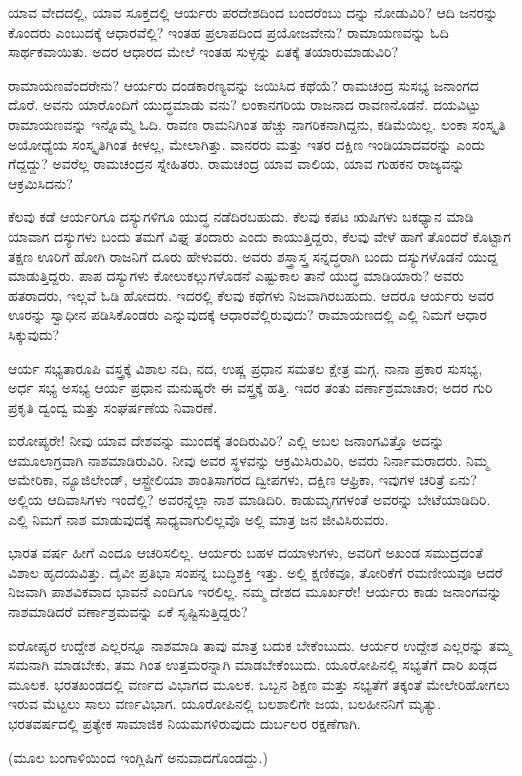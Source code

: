 ಯಾವ ವೇದದಲ್ಲಿ, ಯಾವ ಸೂಕ್ತದಲ್ಲಿ ಆರ್ಯರು ಪರದೇಶದಿಂದ ಬಂದರೆಂಬು ದನ್ನು ನೋಡುವಿರಿ? ಆದಿ ಜನರನ್ನು ಕೊಂದರು ಎಂಬುದಕ್ಕೆ ಆಧಾರವೆಲ್ಲಿ? ಇಂತಹ ಪ್ರಲಾಪದಿಂದ ಪ್ರಯೋಜವೇನು? ರಾಮಾಯಣವನ್ನು ಓದಿ ಸಾರ್ಥಕವಾಯಿತು. ಅದರ ಆಧಾರದ ಮೇಲೆ ಇಂತಹ ಸುಳ್ಳನ್ನು ಏತಕ್ಕೆ ತಯಾರುಮಾಡುವಿರಿ?

ರಾಮಾಯಣವೆಂದರೇನು? ಆರ್ಯರು ದಂಡಕಾರಣ್ಯವನ್ನು ಜಯಿಸಿದ ಕಥೆಯೆ? ರಾಮಚಂದ್ರ ಸುಸಭ್ಯ ಜನಾಂಗದ ದೊರೆ. ಅವನು ಯಾರೊಂದಿಗೆ ಯುದ್ಧಮಾಡು ವನು? ಲಂಕಾನಗರಿಯ ರಾಜನಾದ ರಾವಣನೊಡನೆ. ದಯವಿಟ್ಟು ರಾಮಾಯಣವನ್ನು ಇನ್ನೊಮ್ಮೆ ಓದಿ. ರಾವಣ ರಾಮನಿಗಿಂತ ಹೆಚ್ಚು ನಾಗರಿಕನಾಗಿದ್ದನು, ಕಡಿಮೆಯಿಲ್ಲ. ಲಂಕಾ ಸಂಸ್ಕೃತಿ ಅಯೋಧ್ಯೆಯ ಸಂಸ್ಕೃತಿಗಿಂತ ಕೀಳಲ್ಲ, ಮೇಲಾಗಿತ್ತು. ವಾನರರು ಮತ್ತು ಇತರ ದಕ್ಷಿಣ ಇಂಡಿಯಾದವರನ್ನು ಎಂದು ಗೆದ್ದದ್ದು? ಅವರೆಲ್ಲ ರಾಮಚಂದ್ರನ ಸ್ನೇಹಿತರು. ರಾಮಚಂದ್ರ ಯಾವ ವಾಲಿಯ, ಯಾವ ಗುಹಕನ ರಾಜ್ಯವನ್ನು ಆಕ್ರಮಿಸಿದನು?

ಕೆಲವು ಕಡೆ ಆರ್ಯರಿಗೂ ದಸ್ಯುಗಳಿಗೂ ಯುದ್ಧ ನಡೆದಿರಬಹುದು. ಕೆಲವು ಕಪಟ ಋಷಿಗಳು ಬಕಧ್ಯಾನ ಮಾಡಿ ಯಾವಾಗ ದಸ್ಯುಗಳು ಬಂದು ತಮಗೆ ವಿಘ್ನ ತಂದಾರು ಎಂದು ಕಾಯುತ್ತಿದ್ದರು, ಕೆಲವು ವೇಳೆ ಹಾಗೆ ತೊಂದರೆ ಕೊಟ್ಟಾಗ ತಕ್ಷಣ ಊರಿಗೆ ಹೋಗಿ ರಾಜನಿಗೆ ದೂರು ಹೇಳುವರು. ಅವರು ಶಸ್ತ್ರಾಸ್ತ್ರ ಸನ್ನದ್ಧರಾಗಿ ಬಂದು ದಸ್ಯುಗಳೊಡನೆ ಯುದ್ದ ಮಾಡುತ್ತಿದ್ದರು. ಪಾಪ ದಸ್ಯುಗಳು ಕೋಲುಕಲ್ಲುಗಳೊಡನೆ ಎಷ್ಟುಕಾಲ ತಾನೆ ಯುದ್ಧ ಮಾಡಿಯಾರು? ಅವರು ಹತರಾದರು, ಇಲ್ಲವೆ ಓಡಿ ಹೋದರು. ಇದರಲ್ಲಿ ಕೆಲವು ಕಥೆಗಳು ನಿಜವಾಗಿರಬಹುದು. ಆದರೂ ಆರ್ಯರು ಅವರ ಊರನ್ನು ಸ್ವಾಧೀನ ಪಡಿಸಿಕೊಂಡರು ಎನ್ನುವುದಕ್ಕೆ ಆಧಾರವೆಲ್ಲಿರುವುದು? ರಾಮಾಯಣದಲ್ಲಿ ಎಲ್ಲಿ ನಿಮಗೆ ಆಧಾರ ಸಿಕ್ಕುವುದು?

ಆರ್ಯ ಸಭ್ಯತಾರೂಪಿ ವಸ್ತ್ರಕ್ಕೆ ವಿಶಾಲ ನದಿ, ನದ, ಉಷ್ಣ ಪ್ರಧಾನ ಸಮತಲ ಕ್ಷೇತ್ರ ಮಗ್ಗ. ನಾನಾ ಪ್ರಕಾರ ಸುಸಭ್ಯ, ಅರ್ಧ ಸಭ್ಯ ಅಸಭ್ಯ ಆರ್ಯ ಪ್ರಧಾನ ಮನುಷ್ಯರೇ ಈ ವಸ್ತ್ರಕ್ಕೆ ಹತ್ತಿ. ಇದರ ತಂತು ವರ್ಣಾಶ್ರಮಾಚಾರ; ಅದರ ಗುರಿ ಪ್ರಕೃತಿ ದ್ವಂದ್ವ ಮತ್ತು ಸಂಘರ್ಷಣೆಯ ನಿವಾರಣೆ.

ಐರೋಪ್ಯರೇ! ನೀವು ಯಾವ ದೇಶವನ್ನು ಮುಂದಕ್ಕೆ ತಂದಿರುವಿರಿ? ಎಲ್ಲಿ ಅಬಲ ಜನಾಂಗವಿತ್ತೊ ಅದನ್ನು ಆಮೂಲಾಗ್ರವಾಗಿ ನಾಶಮಾಡಿರುವಿರಿ. ನೀವು ಅವರ ಸ್ಥಳವನ್ನು ಆಕ್ರಮಿಸಿರುವಿರಿ, ಅವರು ನಿರ್ನಾಮರಾದರು. ನಿಮ್ಮ ಅಮೇರಿಕಾ, ನ್ಯೂಜಿಲೇಂಡ್​, ಆಸ್ಟ್ರೇಲಿಯಾ ಶಾಂತಿಸಾಗರದ ದ್ವೀಪಗಳು, ದಕ್ಷಿಣ ಆಫ್ರಿಕಾ, ಇವುಗಳ ಚರಿತ್ರೆ ಏನು? ಅಲ್ಲಿಯ ಆದಿವಾಸಿಗಳು ಇಂದೆಲ್ಲಿ? ಅವರನ್ನೆಲ್ಲಾ ನಾಶ ಮಾಡಿದಿರಿ. ಕಾಡುಮೃಗಗಳಂತೆ ಅವರನ್ನು ಬೇಟೆಯಾಡಿದಿರಿ. ಎಲ್ಲಿ ನಿಮಗೆ ನಾಶ ಮಾಡುವುದಕ್ಕೆ ಸಾಧ್ಯವಾಗುಲಿಲ್ಲವೊ ಅಲ್ಲಿ ಮಾತ್ರ ಜನ ಜೀವಿಸಿರುವರು.

ಭಾರತ ವರ್ಷ ಹೀಗೆ ಎಂದೂ ಆಚರಿಸಲಿಲ್ಲ. ಆರ್ಯರು ಬಹಳ ದಯಾಳುಗಳು, ಅವರಿಗೆ ಅಖಂಡ ಸಮುದ್ರದಂತೆ ವಿಶಾಲ ಹೃದಯವಿತ್ತು. ದೈವೀ ಪ್ರತಿಭಾ ಸಂಪನ್ನ ಬುದ್ಧಿಶಕ್ತಿ ಇತ್ತು. ಅಲ್ಲಿ ಕ್ಷಣಿಕವೂ, ತೋರಿಕೆಗೆ ರಮಣೀಯವೂ ಆದರೆ ನಿಜವಾಗಿ ಪಾಶವಿಕವಾದ ಭಾವನೆ ಎಂದಿಗೂ ಇರಲಿಲ್ಲ. ನಮ್ಮ ದೇಶದ ಮೂರ್ಖರೇ! ಆರ್ಯರು ಕಾಡು ಜನಾಂಗವನ್ನು ನಾಶಮಾಡಿದರೆ ವರ್ಣಾಶ್ರಮವನ್ನು ಏಕೆ ಸೃಷ್ಟಿಸುತ್ತಿದ್ದರು?

ಐರೋಪ್ಯರ ಉದ್ದೇಶ ಎಲ್ಲರನ್ನೂ ನಾಶಮಾಡಿ ತಾವು ಮಾತ್ರ ಬದುಕ ಬೇಕೆಂಬುದು. ಆರ್ಯರ ಉದ್ದೇಶ ಎಲ್ಲರನ್ನು ತಮ್ಮ ಸಮನಾಗಿ ಮಾಡಬೇಕು, ತಮ ಗಿಂತ ಉತ್ತಮರನ್ನಾಗಿ ಮಾಡಬೇಕೆಂಬುದು. ಯೂರೋಪಿನಲ್ಲಿ ಸಭ್ಯತೆಗೆ ದಾರಿ ಖಡ್ಗದ ಮೂಲಕ. ಭರತಖಂಡದಲ್ಲಿ ವರ್ಣದ ವಿಭಾಗದ ಮೂಲಕ. ಒಬ್ಬನ ಶಿಕ್ಷಣ ಮತ್ತು ಸಭ್ಯತೆಗೆ ತಕ್ಕಂತೆ ಮೇಲೇರಿಹೋಗಲು ಇರುವ ಮೆಟ್ಟಲು ಸಾಲು ವರ್ಣವಿಭಾಗ. ಯೂರೋಪಿನಲ್ಲಿ ಬಲಶಾಲಿಗೇ ಜಯ, ಬಲಹೀನನಿಗೆ ಮೃತ್ಯು. ಭರತವರ್ಷದಲ್ಲಿ ಪ್ರತ್ಯೇಕ ಸಾಮಾಜಿಕ ನಿಯಮಗಳಿರುವುದು ದುರ್ಬಲರ ರಕ್ಷಣೆಗಾಗಿ.

\begin{center}
(ಮೂಲ ಬಂಗಾಳಿಯಿಂದ ಇಂಗ್ಲಿಷಿಗೆ ಅನುವಾದಗೊಂಡದ್ದು.)
\end{center}

